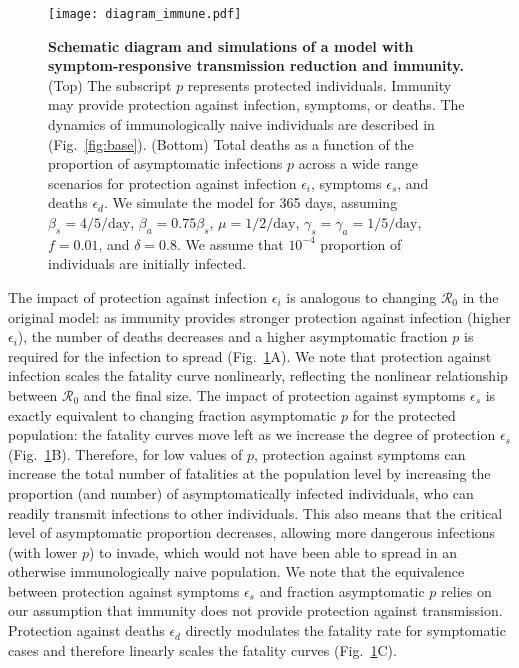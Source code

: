 \documentclass[12pt]{article}
\newcommand{\fref}[1]{Fig.~\ref{fig:#1}}
\newcommand{\RR}{\ensuremath{{\mathcal R}}\xspace}
\begin{document}
\begin{figure}[!ht]
\texttt{[image: diagram\_immune.pdf]}
\caption{
\textbf{Schematic diagram and simulations of a model with symptom-responsive transmission reduction and immunity.}
(Top) The subscript $p$ represents protected individuals. 
Immunity may provide protection against infection, symptoms, or deaths.
The dynamics of immunologically naive individuals are described in (\fref{base}).
(Bottom) Total deaths as a function of the proportion of asymptomatic infections $p$ across a wide range scenarios for protection against infection $\epsilon_i$, symptoms $\epsilon_s$, and deaths $\epsilon_d$.
We simulate the model for 365 days, assuming $\beta_s = 4/5/\mathrm{day}$, $\beta_a = 0.75 \beta_s$, $\mu=1/2/\mathrm{day}$, $\gamma_s=\gamma_a=1/5/\mathrm{day}$, $f=0.01$, and $\delta=0.8$.
We assume that $10^{-4}$ proportion of individuals are initially infected.
}
\label{fig:immune}
\end{figure}

The impact of protection against infection $\epsilon_i$ is analogous to changing $\RR_0$ in the original model: as immunity provides stronger protection against infection (higher $\epsilon_i$), the number of deaths decreases and a higher asymptomatic fraction $p$ is required for the infection to spread (\fref{immune}A).
We note that protection against infection scales the fatality curve nonlinearly, reflecting the nonlinear relationship between $\RR_0$ and the final size.
The impact of protection against symptoms $\epsilon_s$ is exactly equivalent to changing fraction asymptomatic $p$ for the protected population:
the fatality curves move left as we increase the degree of protection $\epsilon_s$ (\fref{immune}B).
Therefore, for low values of $p$, protection against symptoms can increase the total number of fatalities at the population level by increasing the proportion (and number) of asymptomatically infected individuals, who can readily transmit infections to other individuals.
This also means that the critical level of asymptomatic proportion decreases, allowing more dangerous infections (with lower $p$) to invade, which would not have been able to spread in an otherwise immunologically naive population.
We note that the equivalence between protection against symptoms $\epsilon_s$ and fraction asymptomatic $p$ relies on our assumption that immunity does not provide protection against transmission.
Protection against deaths $\epsilon_d$ directly modulates the fatality rate for symptomatic cases and therefore linearly scales the fatality curves (\fref{immune}C).
\end{document}
